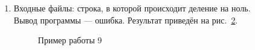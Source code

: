 \documentclass[12pt, a4paper]{article}
\begin{document}
\begin{enumerate}
	Вывод программы --- ошибка. Результат 
	приведён на рис.~\ref{img:grap8}.
	\begin{figure}[h]
  		\caption{Пример работы 8}
  		\label{img:grap8}
	\end{figure}
	\item Входные файлы: строка, в которой происходит
	деление на ноль.\\
	Вывод программы --- ошибка. Результат 
	приведён на рис.~\ref{img:grap9}.
	\begin{figure}[h]
  		\caption{Пример работы 9}
  		\label{img:grap9}
	\end{figure}
\end{enumerate}
\newpage
\end{document}
